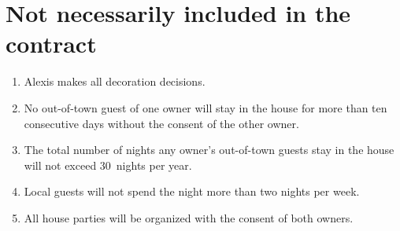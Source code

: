 \documentclass[12pt]{article}
\begin{document}
\section{Not necessarily included in the contract} \begin{enumerate}

\item Alexis makes all decoration decisions.

\item No out-of-town guest of one owner will stay in the house for 
more than ten consecutive days without the consent of the other 
owner.

\item The total number of nights any owner's out-of-town guests stay 
in the house will not exceed 30~nights per year.

\item Local guests will not spend the night more than two nights per 
week.

\item All house parties will be organized with the consent of both 
owners.

\end{enumerate}
\end{document}

